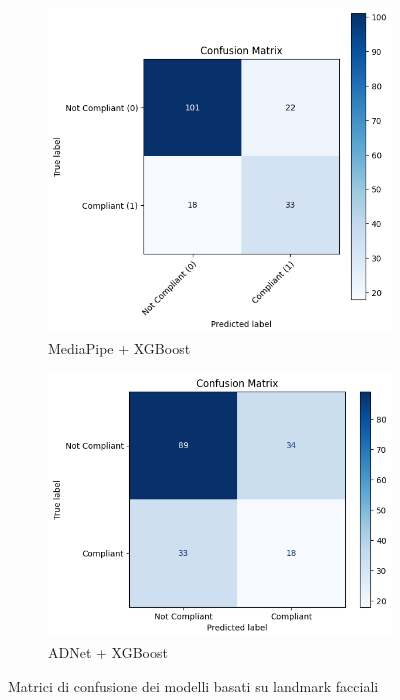 \documentclass[12pt,a4paper,openright,twoside]{book}
\begin{document}
\begin{figure}[htbp]
    \centering
    \begin{subfigure}{0.45\textwidth}
        \centering
        \includegraphics[width=\linewidth]{figures/mediapipe_xgboost_confusion_matrix.png}
        \caption{MediaPipe + XGBoost}
        \label{fig:mediapipe_xgboost_confusion_matrix}
    \end{subfigure}
    \begin{subfigure}{0.45\textwidth}
        \centering
        \includegraphics[width=\linewidth]{figures/adnet_xgboost_confusion_matrix.png}
        \caption{ADNet + XGBoost}
        \label{fig:adnet_xgboost_confusion_matrix}
    \end{subfigure}
    \caption{Matrici di confusione dei modelli basati su landmark facciali}
\end{figure}
\end{document}
